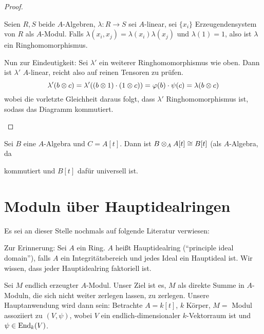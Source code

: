 \documentclass[12pt,a4paper]{scrartcl}
\theoremstyle{cplain}
\theoremstyle{cdef}
\begin{document}
\begin{proof}
\begin{enumerate}[label=\ref{thm:314:\roman*}]
		\begin{bem}
			Seien $R,S$ beide $A$-Algebren, $\lambda\colon R\to S$ sei $A$-linear, sei $\{x_i\}$ Erzeugendensystem von $R$ als $A$-Modul. Falls $\lambda(x_i,x_j) =\lambda(x_i)\lambda(x_j)$ und $\lambda(1) = 1$, also ist $\lambda$ ein Ringhomomorphismus.
		\end{bem}
	
		Nun zur Eindeutigkeit: Sei $\lambda'$ ein weiterer Ringhomomorphismus wie oben. Dann ist $\lambda'$ $A$-linear, reicht also auf reinen Tensoren zu prüfen.
		\[\lambda'(b\otimes c) = \lambda'((b\otimes 1)\cdot(1\otimes c)) = \varphi(b)\cdot \psi(c) = \lambda(b\otimes c)\]
		wobei die vorletzte Gleichheit daraus folgt, dass $\lambda'$ Ringhomomorphismus ist, sodass das Diagramm kommutiert.
		\qedhere
	\end{enumerate}
\end{proof}

\begin{bsp}
	Sei $B$ eine $A$-Algebra und $C= A[t]$. Dann ist $B\otimes_AA[t]\cong B[t]$ (als $A$-Algebra, da
	\begin{center}
	\end{center}
	kommutiert und $B[t]$ dafür universell ist.
\end{bsp}


\section{Moduln über Hauptidealringen}
\label{sec:moduln ueber hir}

Es sei an dieser Stelle nochmals auf folgende Literatur verwiesen:

\printbibliography[keyword=moduln-hir,heading=none]

Zur Erinnerung: Sei $A$ ein Ring. $A$ heißt Hauptidealring (\enquote{principle ideal domain}), falls $A$ ein Integritätsbereich und jedes Ideal ein Hauptideal ist. Wir wissen, dass jeder Hauptidealring faktoriell ist.

Sei $M$ endlich erzeugter $A$-Modul. Unser Ziel ist es, $M$ als direkte Summe in $A$-Moduln, die sich nicht weiter zerlegen lassen, zu zerlegen. Unsere Hauptanwendung wird dann sein: Betrachte $A = k[t]$, $k$ Körper, $M=$ Modul assoziiert zu $(V,\psi)$, wobei $V$ ein endlich-dimensionaler $k$-Vektorraum ist und $\psi\in\operatorname{End}_k(V)$.
\end{document}
